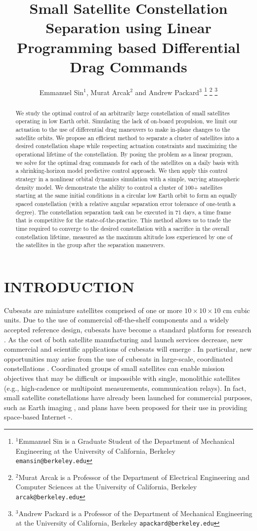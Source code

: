 \documentclass[letterpaper, 10 pt, conference]{ieeeconf}  %
\title{\LARGE \bf
Small Satellite Constellation Separation using Linear Programming based Differential Drag Commands
}
\author{Emmanuel Sin$^{1}$, Murat Arcak$^{2}$ and Andrew Packard$^{3}$%
\thanks{$^{1}$Emmanuel Sin is a Graduate Student of the Department of Mechanical Engineering at the University of California, Berkeley
        {\tt\small emansin@berkeley.edu}}%
\thanks{$^{2}$Murat Arcak is a Professor of the Department of Electrical Engineering and Computer Sciences at the University of California, Berkeley
        {\tt\small arcak@berkeley.edu}}%
\thanks{$^{3}$Andrew Packard is a Professor of the Department of Mechanical Engineering at the University of California, Berkeley 
	{\tt\small apackard@berkeley.edu}}%
}
\begin{document}
\maketitle
\thispagestyle{empty}
\pagestyle{empty}


\begin{abstract}

We study the optimal control of an arbitrarily large constellation of small satellites operating in low Earth orbit. Simulating the lack of on-board propulsion, we limit our actuation to the use of differential drag maneuvers to make in-plane changes to the satellite orbits. We propose an efficient method to separate a cluster of satellites into a desired constellation shape while respecting actuation constraints and maximizing the operational lifetime of the constellation. By posing the problem as a linear program, we solve for the optimal drag commands for each of the satellites on a daily basis with a shrinking-horizon model predictive control approach. We then apply this control strategy in a nonlinear orbital dynamics simulation with a simple, varying atmospheric density model. We demonstrate the ability to control a cluster of 100+ satellites starting at the same initial conditions in a circular low Earth orbit to form an equally spaced constellation (with a relative angular separation error tolerance of one-tenth a degree). The constellation separation task can be executed in 71 days, a time frame that is competitive for the state-of-the-practice. This method allows us to trade the time required to converge to the desired constellation with a sacrifice in the overall constellation lifetime, measured as the maximum altitude loss experienced by one of the satellites in the group after the separation maneuvers. 
\end{abstract}


\section{INTRODUCTION}

Cubesats are miniature satellites comprised of one or more $10\times10\times10$ cm cubic units. Due to the use of commercial off-the-shelf components and a widely accepted reference design, cubesats have become a standard platform for research \cite{CubesatStandard}. As the cost of both satellite manufacturing and launch services decrease, new commercial and scientific applications of cubesats will emerge \cite{CubesatOpps}. In particular, new opportunities may arise from the use of cubesats in large-scale, coordinated constellations \cite{CubesatConstellations}. Coordinated groups of small satellites can enable mission objectives that may be difficult or impossible with single, monolithic satellites (e.g., high-cadence or multipoint measurements, communication relays). In fact, small satellite constellations have already been launched for commercial purposes, such as Earth imaging \cite{Imaging}, and plans have been proposed for their use in providing space-based Internet \cite{Internet1}-\cite{Internet2}.
\end{document}
